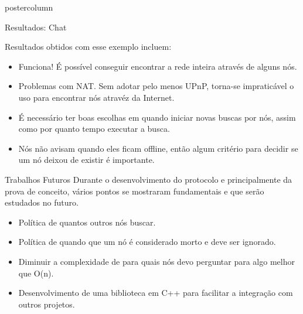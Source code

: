 \documentclass[final]{beamer}
\begin{document}
\begin{frame}
\begin{columns}
\begin{column}{.5\textwidth}
\begin{beamercolorbox}[center,wd=\textwidth]{postercolumn}
\begin{minipage}[T]{.95\textwidth}
{\begin{block}{Resultados: Chat}
                \vspace*{0.4cm}
                
                Resultados obtidos com esse exemplo incluem:
                \begin{itemize}
                  \item Funciona! É possível conseguir encontrar a rede inteira através de alguns nós.
                  \item Problemas com NAT. Sem adotar pelo menos UPnP, torna-se impraticável o uso para encontrar nós atravéz da Internet.
                  \item É necessário ter boas escolhas em quando iniciar novas buscas por nós, assim como por quanto tempo executar a busca.
                  \item Nós não avisam quando eles ficam offline, então algum critério para decidir se um nó deixou de existir é importante.
                \end{itemize}
                
                \vspace*{0.2cm}
            \end{block}
            
            \vspace*{0.2cm} 
            \begin{block}{Trabalhos Futuros}
                Durante o desenvolvimento do protocolo e principalmente da prova de conceito, vários pontos se mostraram fundamentais e que serão estudados no futuro.
                
                \begin{itemize}
                  \item Política de quantos outros nós buscar.
                  \item Política de quando que um nó é considerado morto e deve ser ignorado.
                  \item Diminuir a complexidade de para quais nós devo perguntar para algo melhor que O(n).
                  \item Desenvolvimento de uma biblioteca em C++ para facilitar a integração com outros projetos.
                \end{itemize}
                
                \vspace*{0.2cm} 
            \end{block}
            
}
\end{minipage}
\end{beamercolorbox}
\end{column}
\end{columns}
\end{frame}
\end{document}
